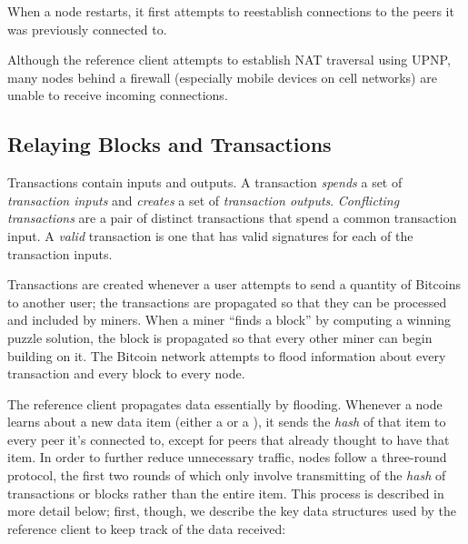 When a node restarts, it first attempts to reestablish connections to the peers it was previously connected to.

Although the reference client attempts to establish NAT traversal using UPNP, many nodes behind a firewall (especially mobile devices on cell networks) are unable to receive incoming connections.

\subsection{Relaying Blocks and Transactions}

Transactions contain inputs and outputs. A transaction \emph{spends} a set of \emph{transaction inputs} and \emph{creates} a set of \emph{transaction outputs}.
\emph{Conflicting transactions} are a pair of distinct transactions that spend a common transaction input.
A \emph{valid} transaction is one that has valid signatures for each of the transaction inputs.

Transactions are created whenever a user attempts to send a quantity of Bitcoins to another user; the transactions are propagated so that they can be processed and included by miners. When a miner ``finds a block'' by computing a winning puzzle solution, the block is propagated so that every other miner can begin building on it. The Bitcoin network attempts to flood information about every transaction and every block to every node. 

The reference client propagates data essentially by flooding. Whenever a node learns about a new data item (either a  or a ), it sends the \emph{hash} of that item to every peer it's connected to, except for peers that already thought to have that item. In order to further reduce unnecessary traffic, nodes follow a three-round protocol, the first two rounds of which only involve transmitting of the \emph{hash} of transactions or blocks rather than the entire item. This process is described in more detail below; first, though, we describe the key data structures used by the reference client to keep track of the data received:

